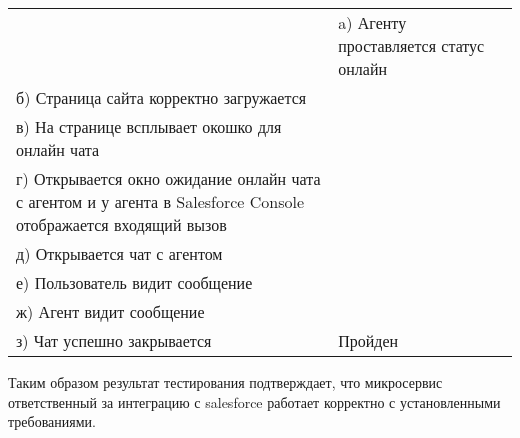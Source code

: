 \begin{longtable}[l]{| >{\raggedright}m{}
                  | >{\raggedright}m{}
                  | >{\raggedright\arraybackslash}m{}|}
    & 

    a) Агенту проставляется статус онлайн \\
    б) Страница сайта корректно загружается \\
    в) На странице всплывает окошко для онлайн чата \\
    г) Открывается окно ожидание онлайн чата с агентом и у агента в Salesforce Console отображается входящий вызов  \\
    д) Открывается чат с агентом \\
    е) Пользователь видит сообщение \\
    ж) Агент видит сообщение \\
    з) Чат успешно закрывается 
    
    & 
    
    Пройден \\ \hline

\end{longtable}
  
Таким образом результат тестирования подтверждает, что микросервис ответственный за интеграцию с salesforce работает корректно с установленными требованиями.

